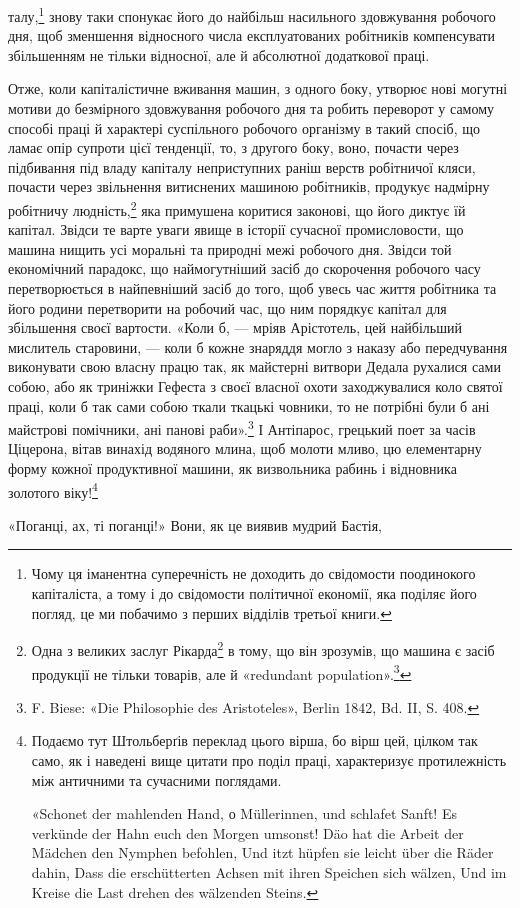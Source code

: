 талу,\footnote{
Чому ця іманентна суперечність не доходить до свідомости поодинокого
капіталіста, а тому і до свідомости політичної економії, яка поділяє
його погляд, це ми побачимо з перших відділів третьої книги.
} знову таки спонукає його до найбільш насильного здовжування
робочого дня, щоб зменшення відносного числа експлуатованих
робітників компенсувати збільшенням не тільки
відносної, але й абсолютної додаткової праці.

Отже, коли капіталістичне вживання машин, з одного боку,
утворює нові могутні мотиви до безмірного здовжування робочого
дня та робить переворот у самому способі праці й характері суспільного
робочого організму в такий спосіб, що ламає опір супроти
цієї тенденції, то, з другого боку, воно, почасти через підбивання
під владу капіталу неприступних раніш верств робітничої кляси,
почасти через звільнення витиснених машиною робітників, продукує
надмірну робітничу людність,\footnote{
Одна з великих заслуг Рікарда\footnote*{
У французькому виданні тут сказано: «Одна з заслуг Сісмонді
та Рікарда в тому, що вони зрозуміли і т. д.». \emph{Ред.}
} в тому, що він зрозумів, що
машина є засіб продукції не тільки товарів, але й «redundant
population».\footnote*{
— надмірної людности. \emph{Ред.}
}
} яка примушена коритися
законові, що його диктує їй капітал. Звідси те варте уваги явище в
історії сучасної промисловости, що машина нищить усі моральні та
природні межі робочого дня. Звідси той економічний парадокс, що
наймогутніший засіб до скорочення робочого часу перетворюється
в найпевніший засіб до того, щоб увесь час життя робітника та
його родини перетворити на робочий час, що ним порядкує капітал
для збільшення своєї вартости. «Коли б, — мріяв Арістотель,
цей найбільший мислитель старовини, — коли б кожне знаряддя
могло з наказу або передчування виконувати свою власну працю
так, як майстерні витвори Дедала рухалися сами собою, або як
триніжки Гефеста з своєї власної охоти заходжувалися коло святої
праці, коли б так сами собою ткали ткацькі човники, то не потрібні
були б ані майстрові помічники, ані панові раби».\footnote{
F. Biese: «Die Philosophie des Aristoteles», Berlin 1842, Bd. II,
S. 408.
} І Антіпарос,
грецький поет за часів Ціцерона, вітав винахід водяного
млина, щоб молоти мливо, цю елементарну форму кожної
продуктивної машини, як визвольника рабинь і відновника золотого
віку!\footnote{
Подаємо тут Штольберґів переклад цього вірша, бо вірш цей,
цілком так само, як і наведені вище цитати про поділ праці, характеризує
протилежність між античними та сучасними поглядами.

«Schonet der mahlenden Hand, о Müllerinnen, und schlafet
Sanft! Es verkünde der Hahn euch den Morgen umsonst!
Däo hat die Arbeit der Mädchen den Nymphen befohlen,
Und itzt hüpfen sie leicht über die Räder dahin,
Dass die erschütterten Achsen mit ihren Speichen sich wälzen,
Und im Kreise die Last drehen des wälzenden Steins.
}

«Поганці, ах, ті поганці!» Вони, як це виявив мудрий Бастія,